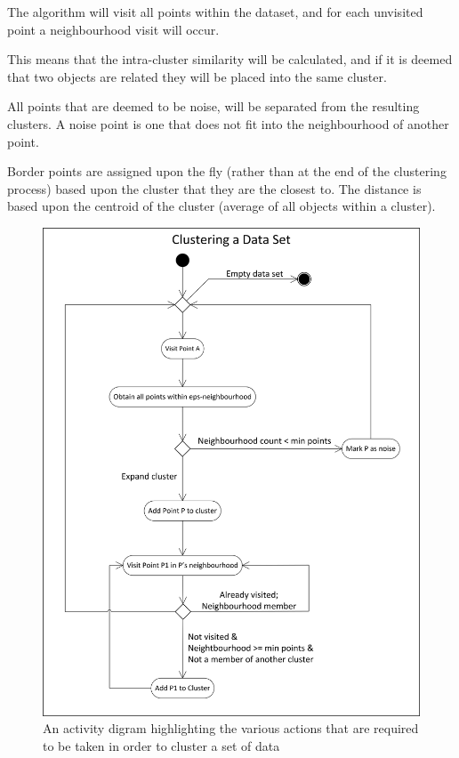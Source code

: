 The algorithm will visit all points within the dataset, and for each 
unvisited point a neighbourhood visit will occur.

This means that the intra-cluster similarity will be calculated, and if it is 
deemed that two objects are related they will be placed into the same cluster.

All points that are deemed to be noise, will be separated from the resulting 
clusters. A noise point is one that does not fit into the neighbourhood of 
another point.

Border points are assigned upon the fly (rather than at the end of the 
clustering process) based upon the cluster that they are the closest to. The 
distance is based upon the centroid of the cluster (average of all objects 
within a cluster).

\begin{figure}[H]
  \centering
    \includegraphics[scale=0.9]{chapter7/activity/clustering_data_set.png}
    \caption[Clustering a data set activity diagram]
            {An activity digram highlighting the various actions that are 
             required to be taken in order to cluster a set of data}
    \label{fig:clusterdataactivity}
\end{figure}




